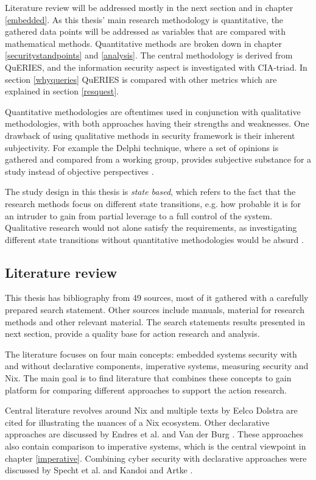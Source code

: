 Literature review will be addressed mostly in the next section and in
chapter \ref{embedded}. As this thesis' main research methodology is
quantitative, the gathered data points will be addressed as variables
that are compared with mathematical methods. Quantitative methods are
broken down in chapter \ref{securitystandpoints} and
\ref{analysis}. The central methodology is derived from QuERIES, and
the information security aspect is investigated with CIA-triad. In section \ref{whyqueries} QuERIES is compared
with other metrics which are explained in section \ref{resquest}.

Quantitative methodologies are oftentimes used in conjunction with
qualitative methodologies, with both approaches having their strengths and
weaknesses. One drawback of using qualitative methods in security
framework is their inherent subjectivity. For example the Delphi
technique, where a set of opinions is gathered and compared from a
working group, provides subjective substance for a study instead of
objective perspectives \cite{wang2005information}.

The study design in this thesis is \textit{state based}, which refers
to the fact that the research methods focus on different state
transitions, e.g. how probable it is  for an intruder to gain from
partial leverage to a full control of the system. Qualitative research
would not alone satisfy the requirements, as investigating different
state transitions without quantitative methodologies would be absurd
\cite{ramos2017model}.

\subsection{Literature review}\label{litrev}

This thesis has bibliography from 49 sources, most of it gathered with
a carefully prepared search statement. Other sources include manuals,
material for research methods and other relevant material. The search
statements results presented in next section, provide a quality base
for action research and analysis.

The literature focuses on four main concepts: embedded systems
security with and without declarative components, imperative systems,
measuring security and Nix. The main goal is to find literature that
combines these concepts to gain platform for comparing different
approaches to support the action research.

Central literature revolves around Nix and multiple texts by Eelco
Dolstra \cite{dolstra2008nixos, dolstra2008nixos, dolstra2013charon, dolstra2007purely, dolstra2004nix} are cited for illustrating the
nuances of a Nix ecosystem. Other declarative approaches are discussed
by Endres et al. \cite{endres2017declarative} and Van der Burg \cite{van2010declarative}. These approaches also contain comparison to
imperative systems, which is the central viewpoint in chapter
\ref{imperative}. Combining cyber security with declarative approaches
were discussed by Specht et al. \cite{specht2007analysis} and Kandoi
and Artke \cite{kandoi2021operating}.

